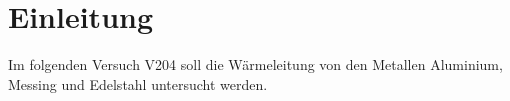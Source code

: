 \section{Einleitung}
\label{sec:einleitung}
Im folgenden Versuch V204 soll die Wärmeleitung von den Metallen Aluminium,
Messing und Edelstahl untersucht werden.
